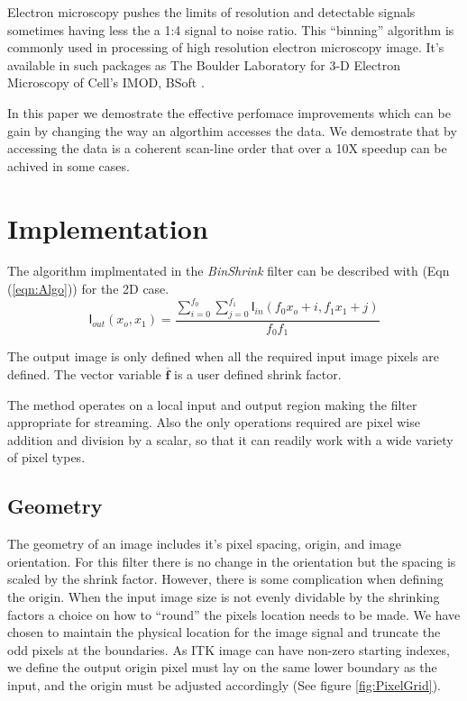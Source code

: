 \documentclass{InsightArticle}
\begin{document}
Electron microscopy  pushes the limits of resolution and detectable
signals sometimes having less the a 1:4 signal to noise ratio.
This ``binning'' algorithm is commonly used in processing of high
resolution electron microscopy image. It's available in such packages
as The Boulder Laboratory for 3-D Electron Microscopy of Cell's
IMOD\cite{IMOD}, BSoft \cite{bsoft2007}.

In this paper we demostrate the effective perfomace improvements which
can be gain by changing the way an algorthim accesses the data. We
demostrate that by accessing the data is a coherent scan-line order
that over a 10X speedup can be achived in some cases.

\section{Implementation}

The algorithm implmentated in the \textit{BinShrink} filter can be
described with (Eqn (\ref{eqn:Algo})) for the 2D case.
\begin{equation}
\label{eqn:Algo}
\mathsf{I}_{out}(x_o,x_1) = \frac{\sum_{i=0}^{f_0}\sum_{j=0}^{f_1}\mathsf{I}_{in}(f_0 x_o+i,f_1 x_1+j)}{f_0 f_1}
\end{equation}

The output image is only defined when all the required input image
pixels are defined. The vector variable $\mathbf{\overline{f}}$ is a user defined
shrink factor.

The method operates on a local input and output region making the
filter appropriate for streaming. Also the only operations required are
pixel wise addition and division by a scalar, so that it can readily
work with a wide variety of pixel types.

\subsection{Geometry}

The geometry of an image includes it's pixel spacing, origin, and
image orientation. For this filter there is no change in the orientation but the
spacing is scaled by the shrink factor. However, there is some
complication when defining the origin. When the input image size is
not evenly dividable by the shrinking factors a choice on how to
``round'' the pixels location needs to be made. We have chosen to maintain the physical
location for the image signal and truncate the odd pixels at the
boundaries. As ITK image can have non-zero starting indexes, we define
the output origin pixel must lay on the same lower boundary as the
input, and the origin must be adjusted accordingly (See figure \ref{fig:PixelGrid}).
\end{document}

